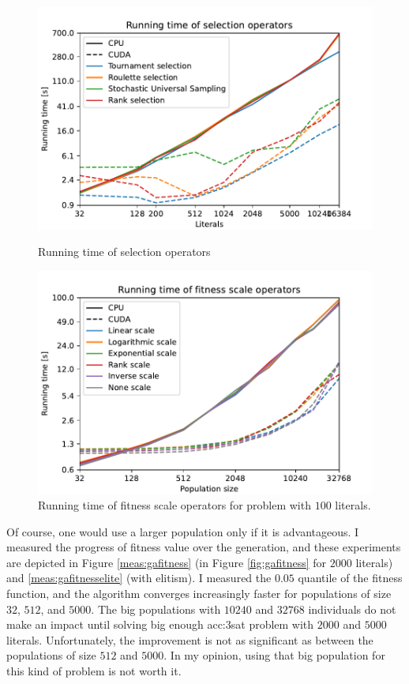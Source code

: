 \begin{figure}
    \begin{minipage}[t]{0.48\textwidth}
        \includegraphics[width=\textwidth]{img/runs/time_ga_selections_with_legend.pdf}
        \caption{Running time of selection operators}
        \label{fig:selectiontime}
    \end{minipage}
    \hfill
    \begin{minipage}[t]{0.48\textwidth}
        \includegraphics[width=\textwidth]{img/runs/time_ga_scale_100l_with_legend.pdf}
        \caption[Running time of fitness scale operators]{Running time of fitness scale operators for problem with $100$ literals.}
        \label{fig:gafitnessscaletime}
    \end{minipage}
\end{figure}


Of course, one would use a larger population only if it is advantageous. I measured the progress of fitness value over the generation, and these experiments are depicted in Figure \ref{meas:gafitness} (in Figure \ref{fig:gafitness} for $2000$ literals) and \ref{meas:gafitnesselite} (with elitism). I measured the $0.05$ quantile of the fitness function, and the algorithm converges increasingly faster for populations of size $32$, $512$, and $5000$. The big populations with $10240$ and $32768$ individuals do not make an impact until solving big enough \acrshort{acc:3sat} problem with $2000$ and $5000$ literals. Unfortunately, the improvement is not as significant as between the populations of size $512$ and $5000$. In my opinion, using that big population for this kind of problem is not worth it.

